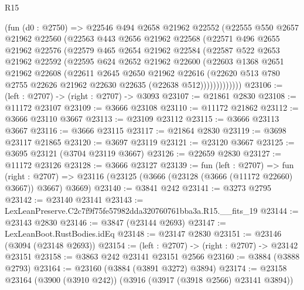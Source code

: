 \begin{lexlean}{R15}
\begin{coremodule}
        (fun (d0 : @2750) =>
        @22546
          @494
          @2658
          @21962
          @22552
          (@22555
            @550
            @2657
            @21962
            @22560
            (@22563
              @443
              @2656
              @21962
              @22568
              (@22571
                @496
                @2655
                @21962
                @22576
                (@22579
                  @465
                  @2654
                  @21962
                  @22584
                  (@22587
                    @522
                    @2653
                    @21962
                    @22592
                    (@22595
                      @624
                      @2652
                      @21962
                      @22600
                      (@22603
                        @1368
                        @2651
                        @21962
                        @22608
                        (@22611
                          @2645
                          @2650
                          @21962
                          @22616
                          (@22620
                            @513
                            @780
                            @2755
                            @22626
                            @21962
                            @22630
                            @22635
                            (@22638 @512)))))))))))))
@23106 := (left : @2707) -> (right : @2707) -> @3093
@23107 := @21861 @2830
@23108 := @11172 @23107
@23109 := @3666 @23108
@23110 := @11172 @21862
@23112 := @3666 @23110 @3667
@23113 := @23109 @23112
@23115 := @3666 @23113 @3667
@23116 := @3666 @23115
@23117 := @21864 @2830
@23119 := @3698 @23117 @21865
@23120 := @3697 @23119
@23121 := @23120 @3667
@23125 := @3695 @23121 (@3704 @23119 @3667)
@23126 := @22659 @2830
@23127 := @11172 @23126
@23128 := @3666 @23127
@23139 := fun (left : @2707) =>
  fun (right : @2707) => @23116 (@23125 (@3666 (@23128 (@3666 (@11172 @22660) @3667)) @3667) @3669)
@23140 := @3841 @242
@23141 := @3273 @2795
@23142 := @23140 @23141
@23143 := LexLeanPreserve.C2c7f9f75fe57982dda320760761bba3a.R15.__fits_19
@23144 := @23143 @2830
@23146 := @3847 (@23144 @2693)
@23147 := LexLeanBoot.RustBodies.idEq
@23148 := @23147 @2830
@23151 := @23146 (@3094 (@23148 @2693))
@23154 := (left : @2707) -> (right : @2707) -> @23142 @23151
@23158 := @3863 @242 @23141 @23151 @2566
@23160 := @3884 (@3888 @2793)
@23164 := @23160 (@3884 (@3891 @3272) @3894)
@23174 := @23158 @23164 (@3900 (@3910 @242)) (@3916 (@3917 (@3918 @2566) @23141 @3894))

\end{coremodule}
\end{lexlean}
